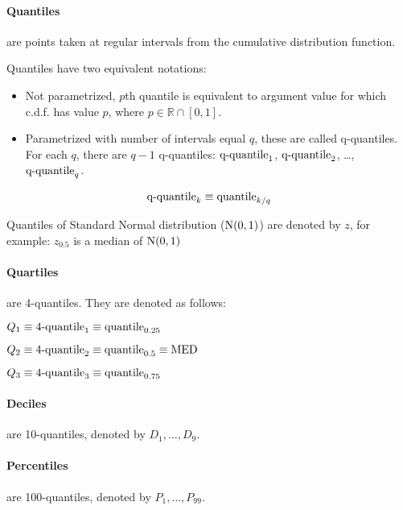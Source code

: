 \paragraph{Quantiles}
are points taken at regular intervals from the cumulative distribution function.

Quantiles have two equivalent notations:
\begin{itemize}[noitemsep,nolistsep]

  \item Not parametrized, $p$th quantile is equivalent to argument value for which c.d.f. has value
  $p$, where $p \in \mathbb{R} \cap [0,1]$.

  \item Parametrized with number of intervals equal $q$, these are called q-quantiles. For each $q$, there
  are $q-1$ q-quantiles: $\textrm{q-quantile}_{1}$, $\textrm{q-quantile}_{2}$, \ldots , $\textrm{q-quantile}_{q}$.

\end{itemize}

\vspace{-10pt}
\begin{gather*}
\textrm{q-quantile}_{k} \equiv \textrm{quantile}_{k/q}
\end{gather*}

Quantiles of Standard Normal distribution ($\textrm{N}(0,1)$) are denoted by $z$, for example: $z_{0.5}$ is a median of $\textrm{N}(0,1)$ 

\paragraph{Quartiles}
are 4-quantiles. They are denoted as follows: 

$Q_1 \equiv \textrm{4-quantile}_{1} \equiv \textrm{quantile}_{0.25}$

$Q_2 \equiv \textrm{4-quantile}_{2} \equiv \textrm{quantile}_{0.5} \equiv \textrm{MED}$

$Q_3 \equiv \textrm{4-quantile}_{3} \equiv \textrm{quantile}_{0.75}$

\paragraph{Deciles}
are 10-quantiles, denoted by $D_1, \ldots , D_9$.

\paragraph{Percentiles}
are 100-quantiles, denoted by $P_{1}, \ldots , P_{99}$.

